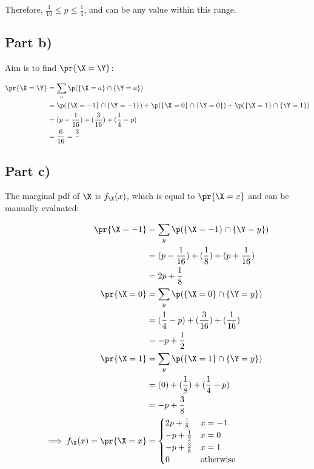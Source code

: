Therefore, $\frac{1}{16} \leq p \leq \frac{1}{4}$, and can be any value within this range.

\subsection{Part b)}
Aim is to find $\pr{\X = \Y}$:

\begin{align*}
\pr{\X = \Y} &= \sum _{a} \p(\{ \X = a \} \cap \{ \Y = a \}) \\
&= \p(\{ \X = -1 \} \cap \{ \Y = -1 \}) + \p(\{ \X = 0 \} \cap \{ \Y = 0 \}) + \p(\{ \X = 1 \} \cap \{ \Y = 1 \}) \\
&= (p - \frac{1}{16}) + (\frac{3}{16}) + (\frac{1}{4} - p) \\
&= \frac{6}{16} = \frac{3}{}
\end{align*}

\subsection{Part c)}
The marginal pdf of $\X$ is $f_{\X}(x)$, which is equal to $\pr{\X = x}$ and can be manually evaluated:

\begin{align*}
\pr{\X = -1} &= \sum _y \p(\{ \X = -1 \} \cap \{ \Y = y \}) \\
&= (p - \frac{1}{16}) + (\frac{1}{8}) + (p + \frac{1}{16}) \\
&= 2p + \frac{1}{8} \\
\pr{\X = 0} &= \sum _y \p(\{ \X = 0 \} \cap \{ \Y = y \}) \\
&= (\frac{1}{4} - p) + (\frac{3}{16}) + (\frac{1}{16}) \\
&= -p + \frac{1}{2} \\
\pr{\X = 1} &= \sum _y \p(\{ \X = 1 \} \cap \{ \Y = y \}) \\
&= (0) + (\frac{1}{8}) + (\frac{1}{4} - p) \\
&= -p + \frac{3}{8} \\
\implies f_{\X}(x) = \pr{\X = x} &= \begin{cases}
2p + \frac{1}{8} & x = -1 \\
-p + \frac{1}{2} & x = 0 \\
-p + \frac{3}{8} & x = 1 \\
0 & \text{otherwise}
\end{cases}
\end{align*}

